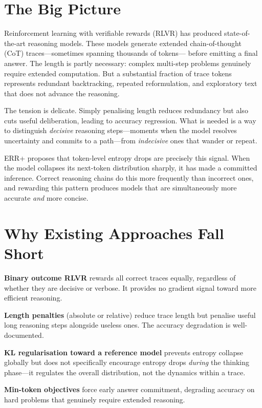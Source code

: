 \documentclass[10pt,twocolumn]{article}
\begin{document}
\section{The Big Picture}

Reinforcement learning with verifiable rewards (RLVR) has produced
state-of-the-art reasoning models. These models generate extended
chain-of-thought (CoT) traces---sometimes spanning thousands of tokens---
before emitting a final answer. The length is partly necessary: complex
multi-step problems genuinely require extended computation. But a
substantial fraction of trace tokens represents redundant backtracking,
repeated reformulation, and exploratory text that does not advance the
reasoning.

The tension is delicate. Simply penalising length reduces redundancy but
also cuts useful deliberation, leading to accuracy regression. What is
needed is a way to distinguish \emph{decisive} reasoning steps---moments
when the model resolves uncertainty and commits to a path---from
\emph{indecisive} ones that wander or repeat.

ERR+ proposes that token-level entropy drops are precisely this signal.
When the model collapses its next-token distribution sharply, it has made
a committed inference. Correct reasoning chains do this more frequently
than incorrect ones, and rewarding this pattern produces models that are
simultaneously more accurate \emph{and} more concise.

\section{Why Existing Approaches Fall Short}

\textbf{Binary outcome RLVR} rewards all correct traces equally,
regardless of whether they are decisive or verbose. It provides no
gradient signal toward more efficient reasoning.

\textbf{Length penalties} (absolute or relative) reduce trace length but
penalise useful long reasoning steps alongside useless ones. The accuracy
degradation is well-documented.

\textbf{KL regularisation toward a reference model} prevents entropy
collapse globally but does not specifically encourage entropy drops
\emph{during} the thinking phase---it regulates the overall distribution,
not the dynamics within a trace.

\textbf{Min-token objectives} force early answer commitment, degrading
accuracy on hard problems that genuinely require extended reasoning.
\end{document}
